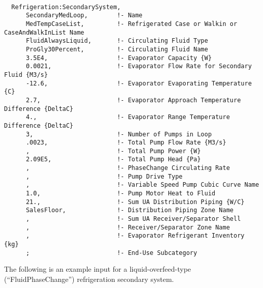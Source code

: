\begin{lstlisting}

  Refrigeration:SecondarySystem,
      SecondaryMedLoop,        !- Name
      MedTempCaseList,         !- Refrigerated Case or Walkin or CaseAndWalkInList Name
      FluidAlwaysLiquid,       !- Circulating Fluid Type
      ProGly30Percent,         !- Circulating Fluid Name
      3.5E4,                   !- Evaporator Capacity {W}
      0.0021,                  !- Evaporator Flow Rate for Secondary Fluid {M3/s}
      -12.6,                   !- Evaporator Evaporating Temperature {C}
      2.7,                     !- Evaporator Approach Temperature Difference {DeltaC}
      4.,                      !- Evaporator Range Temperature Difference {DeltaC}
      3,                       !- Number of Pumps in Loop
      .0023,                   !- Total Pump Flow Rate {M3/s}
      ,                        !- Total Pump Power {W}
      2.09E5,                  !- Total Pump Head {Pa}
      ,                        !- PhaseChange Circulating Rate
      ,                        !- Pump Drive Type
      ,                        !- Variable Speed Pump Cubic Curve Name
      1.0,                     !- Pump Motor Heat to Fluid
      21.,                     !- Sum UA Distribution Piping {W/C}
      SalesFloor,              !- Distribution Piping Zone Name
      ,                        !- Sum UA Receiver/Separator Shell
      ,                        !- Receiver/Separator Zone Name
      ,                        !- Evaporator Refrigerant Inventory {kg}
      ;                        !- End-Use Subcategory
\end{lstlisting}

The following is an example input for a liquid-overfeed-type (``FluidPhaseChange'') refrigeration secondary system.

